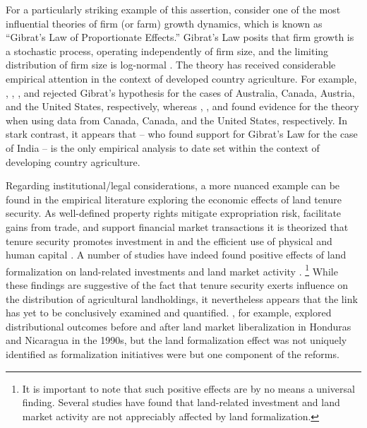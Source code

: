 \documentclass[english]{article}
\begin{document}
For a particularly striking example of this assertion, consider one of the 
most influential theories of firm (or farm) growth dynamics, which is known 
as ``Gibrat's Law of Proportionate Effects.''
Gibrat's Law posits that firm growth is a stochastic process, operating 
independently of firm size, and the limiting distribution of firm size is 
log-normal \citep{gibrat1931, sutton1997}.
The theory has received considerable empirical attention in the context
of developed country agriculture.
For example, \citet{jarrett1968}, \citet{shapiro1987}, \citet{weiss1999}, 
and \citet{melhim2009a} rejected Gibrat's hypothesis for the cases of Australia, 
Canada, Austria, and the United States, respectively, whereas \citet{clark1992}, \citet{fulton1995}, and \citet{melhim2009b} found evidence for the  
theory when using data from Canada, Canada, and the United States, 
respectively.  
In stark contrast, it appears that \citet{shergill1991} -- who found support for 
Gibrat's Law for the case of India -- is the only empirical analysis to date set 
within the context of developing country agriculture.

Regarding institutional/legal considerations, a more nuanced example can be 
found in the empirical literature exploring the economic effects of land 
tenure security.
As well-defined property rights mitigate expropriation risk, facilitate gains 
from trade, and support financial market transactions it is theorized that
tenure security promotes investment in and the efficient use of physical and 
human capital \citep{besley2010}.
A number of studies have indeed found positive effects of land formalization 
on land-related investments \citep{feder1988, besley1995, deininger2008} and 
land market activity \citep{deininger2003, boucher2005, deininger2008b}.%
\footnote{It is important to note that such positive effects are by no means
a universal finding. 
Several studies have found that land-related investment \citep{migot1991, 
gavian1996, brasselle2002} and land market activity \citep{deininger2005, 
gould2006, barnes2007} are not appreciably affected by land formalization.}
While these findings are suggestive of the fact that tenure security exerts 
influence on the distribution of agricultural landholdings, it nevertheless 
appears that the link has yet to be conclusively examined and quantified.
\citet{boucher2005}, for example, explored distributional outcomes before 
and after land market liberalization in Honduras and Nicaragua in the 1990s, 
but the land formalization effect was not uniquely identified as formalization 
initiatives were but one component of the reforms.
\end{document}
